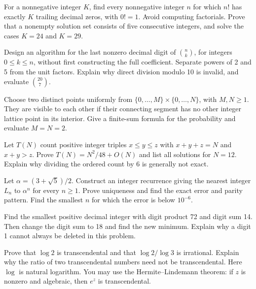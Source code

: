 For a nonnegative integer $K$, find every nonnegative integer $n$ for which $n!$ has exactly $K$ trailing decimal zeros, with $0!=1$. Avoid computing factorials. Prove that a nonempty solution set consists of five consecutive integers, and solve the cases $K=24$ and $K=29$.

Design an algorithm for the last nonzero decimal digit of $\binom nk$, for integers $0\le k\le n$, without first constructing the full coefficient. Separate powers of 2 and 5 from the unit factors. Explain why direct division modulo 10 is invalid, and evaluate $\binom{20}{7}$.

Choose two distinct points uniformly from $\{0,\ldots,M\}\times\{0,\ldots,N\}$, with $M,N\ge1$. They are visible to each other if their connecting segment has no other integer lattice point in its interior. Give a finite-sum formula for the probability and evaluate $M=N=2$.

\pagebreak
{}
Let $T(N)$ count positive integer triples $x\le y\le z$ with $x+y+z=N$ and $x+y>z$. Prove $T(N)=N^2/48+O(N)$ and list all solutions for $N=12$. Explain why dividing the ordered count by 6 is generally not exact.

Let $\alpha=(3+\sqrt5)/2$. Construct an integer recurrence giving the nearest integer $L_n$ to $\alpha^n$ for every $n\ge1$. Prove uniqueness and find the exact error and parity pattern. Find the smallest $n$ for which the error is below $10^{-6}$.

Find the smallest positive decimal integer with digit product 72 and digit sum 14. Then change the digit sum to 18 and find the new minimum. Explain why a digit 1 cannot always be deleted in this problem.

Prove that $\log2$ is transcendental and that $\log2/\log3$ is irrational. Explain why the ratio of two transcendental numbers need not be transcendental. Here $\log$ is natural logarithm. You may use the Hermite--Lindemann theorem: if $z$ is nonzero and algebraic, then $e^z$ is transcendental.
